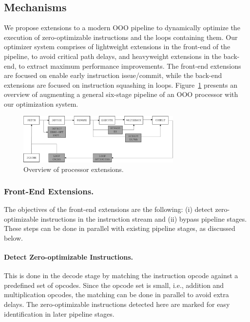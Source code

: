 \subsection{Mechanisms}

We propose extensions to a modern OOO pipeline to dynamically optimize the execution of zero-optimizable instructions and the loops containing them.  Our optimizer system comprises of lightweight extensions in the front-end of the pipeline, to avoid critical path delays, and heavyweight extensions in the back-end, to extract maximum performance improvements.  The front-end extensions are focused on enable early instruction issue/commit, while the back-end extensions are focused on instruction squashing in loops.  Figure~\ref{fig:opt_pipeline} presents an overview of augmenting a general six-stage pipeline of an OOO processor with our optimization system.

\begin{figure}
\centering
\includegraphics[height=1in]{Figures/pipeline.png}
\caption{Overview of processor extensions.}
\label{fig:opt_pipeline}
\end{figure}

\subsubsection{Front-End Extensions.}
The objectives of the front-end extensions are the following: (i) detect zero-optimizable instructions in the instruction stream and (ii) bypass pipeline stages.  These steps can be done in parallel with existing pipeline stages, as discussed below.  

\paragraph{Detect Zero-optimizable Instructions.}
This is done in the decode stage by matching the instruction opcode against a predefined set of opcodes. Since the opcode set is small, i.e., addition and multiplication opcodes, the matching can be done in parallel to avoid extra delays.  The zero-optimizable instructions detected here are marked for easy identification in later pipeline stages. 

